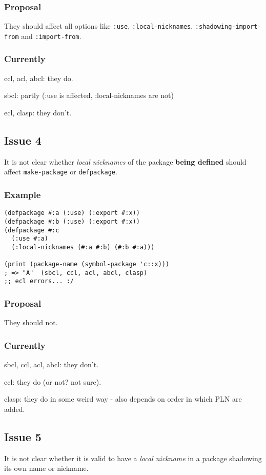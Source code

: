 \documentclass[11pt]{article}
\begin{document}
\subsubsection{Proposal}
\label{sec:org9c3042d}
They should affect all options like \texttt{:use}, \texttt{:local-nicknames},
\texttt{:shadowing-import-from} and \texttt{:import-from}.
\subsubsection{Currently}
\label{sec:orgbe4edcd}
ccl, acl, abcl: they do.

sbcl: partly (:use is affected, :local-nicknames are not)

ecl, clasp: they don't.
\subsection{Issue 4}
\label{sec:org4ff41e3}
It is not clear whether \emph{local nicknames} of the package \textbf{being defined}
should affect \texttt{make-package} or \texttt{defpackage}.
\subsubsection{Example}
\label{sec:org599d6c4}
\begin{verbatim}
(defpackage #:a (:use) (:export #:x))
(defpackage #:b (:use) (:export #:x))
(defpackage #:c
  (:use #:a)
  (:local-nicknames (#:a #:b) (#:b #:a)))

(print (package-name (symbol-package 'c::x)))
; => "A"  (sbcl, ccl, acl, abcl, clasp)
;; ecl errors... :/
\end{verbatim}
\subsubsection{Proposal}
\label{sec:org52eda52}
They should not.
\subsubsection{Currently}
\label{sec:org9a96c3a}
sbcl, ccl, acl, abcl: they don't.

ecl: they do (or not? not sure).

clasp: they do in some weird way - also depends on order in which PLN are
added.
\subsection{Issue 5}
\label{sec:orgd9809d0}
It is not clear whether it is valid to have a \emph{local nickname} in a package
shadowing its own name or nickname.
\end{document}

